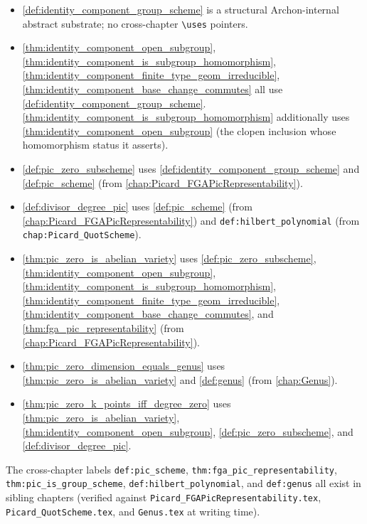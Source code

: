 \begin{itemize}
  \item \cref{def:identity_component_group_scheme} is a structural
    Archon-internal abstract substrate; no cross-chapter
    \texttt{\textbackslash uses} pointers.
  \item \cref{thm:identity_component_open_subgroup},
    \cref{thm:identity_component_is_subgroup_homomorphism},
    \cref{thm:identity_component_finite_type_geom_irreducible},
    \cref{thm:identity_component_base_change_commutes} all use
    \cref{def:identity_component_group_scheme}.
    \cref{thm:identity_component_is_subgroup_homomorphism} additionally
    uses \cref{thm:identity_component_open_subgroup} (the clopen
    inclusion whose homomorphism status it asserts).
  \item \cref{def:pic_zero_subscheme} uses
    \cref{def:identity_component_group_scheme} and
    \cref{def:pic_scheme} (from
    \cref{chap:Picard_FGAPicRepresentability}).
  \item \cref{def:divisor_degree_pic} uses \cref{def:pic_scheme}
    (from \cref{chap:Picard_FGAPicRepresentability}) and
    \texttt{def:hilbert\_polynomial} (from \texttt{chap:Picard\_QuotScheme}).
  \item \cref{thm:pic_zero_is_abelian_variety} uses
    \cref{def:pic_zero_subscheme},
    \cref{thm:identity_component_open_subgroup},
    \cref{thm:identity_component_is_subgroup_homomorphism},
    \cref{thm:identity_component_finite_type_geom_irreducible},
    \cref{thm:identity_component_base_change_commutes}, and
    \cref{thm:fga_pic_representability} (from
    \cref{chap:Picard_FGAPicRepresentability}).
  \item \cref{thm:pic_zero_dimension_equals_genus} uses
    \cref{thm:pic_zero_is_abelian_variety} and
    \cref{def:genus} (from \cref{chap:Genus}).
  \item \cref{thm:pic_zero_k_points_iff_degree_zero} uses
    \cref{thm:pic_zero_is_abelian_variety},
    \cref{thm:identity_component_open_subgroup},
    \cref{def:pic_zero_subscheme}, and
    \cref{def:divisor_degree_pic}.
\end{itemize}

The cross-chapter labels \texttt{def:pic\_scheme},
\texttt{thm:fga\_pic\_representability},
\texttt{thm:pic\_is\_group\_scheme},
\texttt{def:hilbert\_polynomial}, and \texttt{def:genus} all exist in
sibling chapters (verified against
\texttt{Picard\_FGAPicRepresentability.tex},
\texttt{Picard\_QuotScheme.tex}, and \texttt{Genus.tex} at writing
time).
